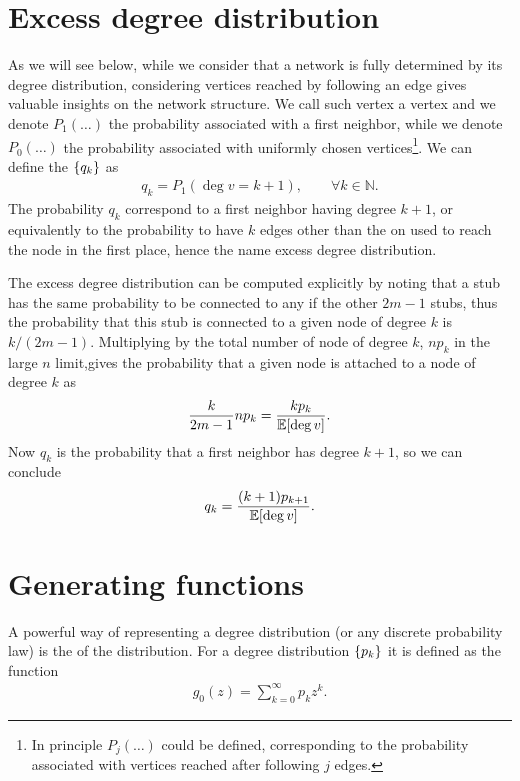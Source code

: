 \documentclass[
11pt, %
english, %
singlespacing, %
nolistspacing, %
liststotoc, %
headsepline, %
]{MastersDoctoralThesis} %
\begin{document}
\section{Excess degree distribution}

As we will see below, while we consider that a network is fully determined by its degree distribution, considering vertices reached by following an edge gives valuable insights on the network structure. We call such vertex a  vertex and we denote $P_1(\dots)$ the probability associated with a first neighbor, while we denote $P_0(\dots)$ the probability associated with uniformly chosen vertices\footnote{In principle $P_j(\dots)$ could be defined, corresponding to the probability associated with vertices reached after following $j$ edges.}. We can define the  $\{q_k\}$ as
\begin{align}
	q_k = P_1(\deg{v} = k + 1), \qquad \forall k \in \mathbb{N}.
\end{align}
The probability $q_k$ correspond to a first neighbor having degree $k + 1$, or equivalently to the probability to have $k$ edges other than the on used to reach the node in the first place, hence the name excess degree distribution.

The excess degree distribution can be computed explicitly by noting that a stub has the same probability to be connected to any if the other $2 m - 1$ stubs, thus the probability that this stub is connected to a given node of degree $k$ is $k/(2 m - 1)$. Multiplying by the total number of node of degree $k$, $n p_k$ in the large $n$ limit,gives the probability that a given node is attached to a node of degree $k$ as
\begin{align}
	\frac{k}{2 m -1} n p_k = \frac{k p_k}{\mathbb{E}\!\left[ \deg{v} \right]}.
\end{align}
Now $q_k$ is the probability that a first neighbor has degree $k + 1$, so we can conclude
\begin{align}
	q_k = \frac{(k + 1) p_{k+1}}{\mathbb{E}\!\left[ \deg{v} \right]}. \label{qk as function of pk}
\end{align}

\section{Generating functions}
\label{Section: Generating functions}

A powerful way of representing a degree distribution (or any discrete probability law) is the  of the distribution. For a degree distribution $\{p_k\}$ it is defined as the function
\begin{align}
	g_0(z) = \sum_{k=0}^\infty p_k z^k. \label{Definition of g0}
\end{align}
\end{document}

